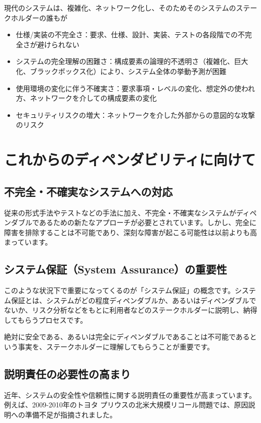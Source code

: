 現代のシステムは、複雑化、ネットワーク化し、そのためそのシステムのステークホルダーの誰もが
\begin{itemize}
\item 仕様/実装の不完全さ：要求、仕様、設計、実装、テストの各段階での不完全さが避けられない
\item システムの完全理解の困難さ：構成要素の論理的不透明さ（複雑化、巨大化、ブラックボックス化）により、システム全体の挙動予測が困難
\item 使用環境の変化に伴う不確実さ：要求事項・レベルの変化、想定外の使われ方、ネットワークを介しての構成要素の変化
\item セキュリティリスクの増大：ネットワークを介した外部からの意図的な攻撃のリスク
\end{itemize}

\section{これからのディペンダビリティに向けて}

\subsection{不完全・不確実なシステムへの対応}

従来の形式手法やテストなどの手法に加え、不完全・不確実なシステムがディペンダブルであるための新たなアプローチが必要とされています。しかし、完全に障害を排除することは不可能であり、深刻な障害が起こる可能性は以前よりも高まっています。

\subsection{システム保証（System Assurance）の重要性}

このような状況下で重要になってくるのが「システム保証」の概念です。システム保証とは、システムがどの程度ディペンダブルか、あるいはディペンダブルでないか、リスク分析などをもとに利用者などのステークホルダーに説明し、納得してもらうプロセスです。

絶対に安全である、あるいは完全にディペンダブルであることは不可能であるという事実を、ステークホルダーに理解してもらうことが重要です。

\subsection{説明責任の必要性の高まり}

近年、システムの安全性や信頼性に関する説明責任の重要性が高まっています。例えば、2009-2010年のトヨタ プリウスの北米大規模リコール問題では、原因説明への準備不足が指摘されました。

